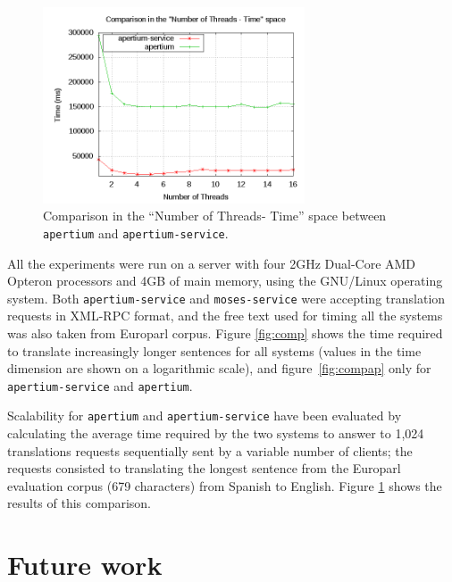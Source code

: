 \documentclass[11pt]{article}
\begin{document}
\begin{figure}[!ht]
\begin{center}
\includegraphics[width=7.75cm]{compmt}
\end{center}
\caption{Comparison in the ``Number of Threads- Time'' space between {\tt apertium} and {\tt apertium-service}.}
\label{fig:compmt}
\end{figure}

All the experiments were run on a server with four 2GHz Dual-Core AMD Opteron processors and 4GB of main memory, using the GNU/Linux operating system. Both {\tt\small apertium-service} and {\tt\small moses-service} were accepting translation requests in XML-RPC format, and the free text used for timing all the systems was also taken from Europarl corpus. Figure \ref{fig:comp} shows the time required to translate increasingly longer sentences for all systems (values in the time dimension are shown on a logarithmic scale), and figure~\ref{fig:compap} only for {\tt\small apertium-service} and {\tt\small apertium}.

Scalability for {\tt\small apertium} and {\tt\small apertium-service} have been evaluated by calculating the average time required by the two systems to answer to 1,024 translations requests sequentially sent by a variable number of clients; the requests consisted to translating the longest sentence from the Europarl evaluation corpus (679 characters) from Spanish to English. Figure \ref{fig:compmt} shows the results of this comparison.



\section{Future work}
\end{document}
